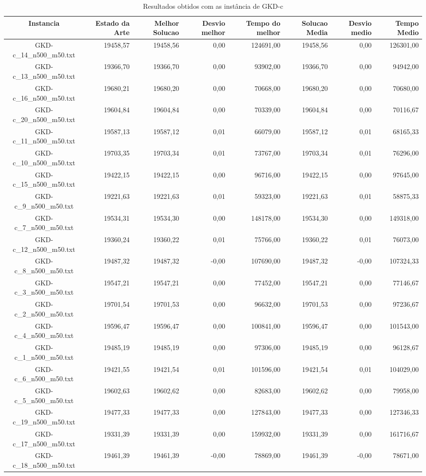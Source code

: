 \begin{landscape}
	\begin{table}[t]
	\centering
	\begin{tabular}{| c | r | r | r | r | r | r | r |  }
\hline
Instancia&Estado da Arte&Melhor Solucao&Desvio melhor&Tempo do melhor&Solucao Media&Desvio medio&Tempo Medio\\ \hline 
		GKD-c\_14\_n500\_m50.txt&19458,57&19458,56&0,00&124691,00&19458,56&0,00&126301,00\\
		GKD-c\_13\_n500\_m50.txt&19366,70&19366,70&0,00&93902,00&19366,70&0,00&94942,00\\
		GKD-c\_16\_n500\_m50.txt&19680,21&19680,20&0,00&70668,00&19680,20&0,00&70680,00\\
		GKD-c\_20\_n500\_m50.txt&19604,84&19604,84&0,00&70339,00&19604,84&0,00&70116,67\\
		GKD-c\_11\_n500\_m50.txt&19587,13&19587,12&0,01&66079,00&19587,12&0,01&68165,33\\
		GKD-c\_10\_n500\_m50.txt&19703,35&19703,34&0,01&73767,00&19703,34&0,01&76296,00\\
		GKD-c\_15\_n500\_m50.txt&19422,15&19422,15&0,00&96716,00&19422,15&0,00&97645,00\\
		GKD-c\_9\_n500\_m50.txt&19221,63&19221,63&0,01&59323,00&19221,63&0,01&58875,33\\
		GKD-c\_7\_n500\_m50.txt&19534,31&19534,30&0,00&148178,00&19534,30&0,00&149318,00\\
		GKD-c\_12\_n500\_m50.txt&19360,24&19360,22&0,01&75766,00&19360,22&0,01&76073,00\\
		GKD-c\_8\_n500\_m50.txt&19487,32&19487,32&-0,00&107690,00&19487,32&-0,00&107324,33\\
		GKD-c\_3\_n500\_m50.txt&19547,21&19547,21&0,00&77452,00&19547,21&0,00&77146,67\\
		GKD-c\_2\_n500\_m50.txt&19701,54&19701,53&0,00&96632,00&19701,53&0,00&97236,67\\
		GKD-c\_4\_n500\_m50.txt&19596,47&19596,47&0,00&100841,00&19596,47&0,00&101543,00\\
		GKD-c\_1\_n500\_m50.txt&19485,19&19485,19&0,00&97306,00&19485,19&0,00&96128,67\\
		GKD-c\_6\_n500\_m50.txt&19421,55&19421,54&0,01&101596,00&19421,54&0,01&104029,00\\
		GKD-c\_5\_n500\_m50.txt&19602,63&19602,62&0,00&82683,00&19602,62&0,00&79958,00\\
		GKD-c\_19\_n500\_m50.txt&19477,33&19477,33&0,00&127843,00&19477,33&0,00&127346,33\\
		GKD-c\_17\_n500\_m50.txt&19331,39&19331,39&0,00&159932,00&19331,39&0,00&161716,67\\
		GKD-c\_18\_n500\_m50.txt&19461,39&19461,39&-0,00&78869,00&19461,39&-0,00&78671,00\\
\hline
	\end{tabular}
	\caption{Resultados obtidos com as instância de GKD-c}
	\label{tabela_gkd_c}
	\end{table}
\end{landscape}

